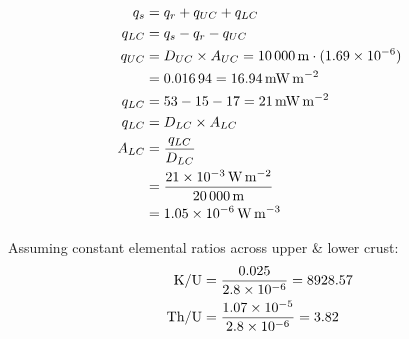 \documentclass{template}
\begin{document}
\begin{enumerate}[label=\textbf{\arabic*.}]
\begin{enumerate}[label=\alph*)]
{    \begin{align*}
    q_s &= q_r + q_{UC} + q_{LC} \\
    q_{LC} &= q_s - q_r - q_{UC} \\
    q_{UC} &= D_{UC} \times A_{UC} = \qty{10000}{\m} \cdot (\num{1.69E-6}) \\
    &= \num{0.01694} = \qty{16.94}{\milli\watt\per\meter\squared} \\
    q_{LC} &= 53 - 15 - 17 = \qty{21}{\milli\watt\per\meter\squared} \\
    q_{LC} &= D_{LC} \times A_{LC} \\
    A_{LC} &= \frac{q_{LC}}{D_{LC}} \\
    &= \frac{\qty{21E-3}{\watt\per\meter\squared}}{\qty{20000}{\m}} \\
    &= \qty{1.05E-6}{\watt\per\meter\cubed}
    \end{align*}


    Assuming constant elemental ratios across upper \& lower crust:
    \begin{align*}
    \text{K}/\text{U} &= \frac{0.025}{\num{2.8E-6}} = 8928.57 \\
    \text{Th}/\text{U} &= \frac{\num{1.07E-5}}{\num{2.8E-6}} = 3.82
    \end{align*}

}
\end{enumerate}
\end{enumerate}
\end{document}
